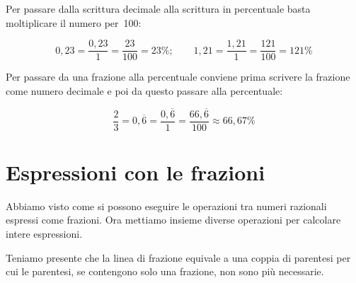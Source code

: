 Per passare dalla scrittura decimale alla scrittura in percentuale basta 
moltiplicare il numero per~100:

\vspace{-.5em}
\[
0,23 = \frac{0,23}{1} = \frac{23}{100} = 23\%; \qquad
1,21 = \frac{1,21}{1} = \frac{121}{100} = 121\%
\]

Per passare da una frazione alla percentuale conviene prima scrivere la 
frazione come numero decimale e poi da questo passare alla percentuale:

\vspace{-.5em}
\[\frac{2}{3} = 0,\overline{6} = \frac{0,\overline{6}}{1} = 
  \frac{66,\overline{6}}{100} \approx  66,67\%\]


\section{Espressioni con le frazioni}
\label{sec:03_espressioni}

Abbiamo visto come si possono eseguire le operazioni tra numeri razionali 
espressi come frazioni. Ora mettiamo insieme diverse operazioni per calcolare 
intere espressioni.

Teniamo presente che la linea di frazione equivale a una coppia 
di parentesi per cui le parentesi, se contengono solo una frazione, 
non sono più necessarie.

